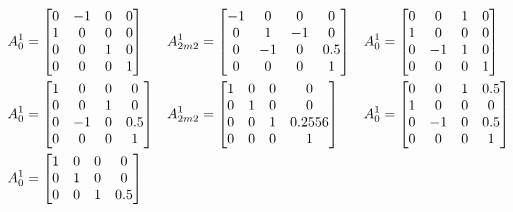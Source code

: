 \documentclass{UoNMCHA}
\numberwithin{equation}{section}
\begin{document}
	\begin{align*}
	A_0^1 &= 
	\begin{bmatrix}
	0 & -1 & 0 & 0 \\
	1 & 0 & 0 & 0\\
	0 & 0 & 1 & 0\\
	0 & 0 & 0 & 1\\
	\end{bmatrix} & 		
	A_{2m2}^1 &= 
	\begin{bmatrix}
	-1 & 0 & 0 & 0 \\
	0 & 1 & -1 & 0\\
	0 & -1 & 0 & 0.5\\
	0 & 0 & 0 & 1\\
	\end{bmatrix} &	
	A_0^1 &= 
	\begin{bmatrix}
	0 & 0 & 1 & 0 \\
	1 & 0 & 0 & 0\\
	0 & -1 & 1 & 0\\
	0 & 0 & 0 & 1\\
	\end{bmatrix} \\ \vspace{5mm}
	A_0^1 &= 
	\begin{bmatrix}
	1 & 0 & 0 & 0 \\
	0 & 0 & 1 & 0\\
	0 & -1 & 0 & 0.5\\
	0 & 0 & 0 & 1\\
	\end{bmatrix} & 		
	A_{2m2}^1 &= 
	\begin{bmatrix}
	1 & 0 & 0 & 0 \\
	0 & 1 & 0 & 0\\
	0 & 0 & 1 & 0.2556\\
	0 & 0 & 0 & 1\\
	\end{bmatrix} &	
	A_0^1 &= 
	\begin{bmatrix}
	0 & 0 & 1 & 0.5 \\
	1 & 0 & 0 & 0\\
	0 & -1 & 0 & 0.5\\
	0 & 0 & 0 & 1\\
	\end{bmatrix} \\ \vspace{5mm}
	A_0^1 &= 
	\begin{bmatrix}
	1 & 0 & 0 & 0 \\
	0 & 1 & 0 & 0\\
	0 & 0 & 1 & 0.5\\

\end{bmatrix}
\end{align*}
\end{document}
